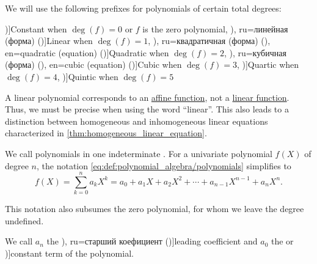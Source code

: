 \begin{definition}\label{def:polynomial_degree_terminology}
  We will use the following prefixes for polynomials of certain total degrees:
  \begin{thmenum}
     \term[ru=константа (\cite[118]{Тыртышников2007ЛинейнаяАлгебра})]{Constant} when \( \deg(f) = 0 \) or \( f \) is the zero polynomial,
     \term[bg=линейна (функция) (\cite[1]{Обрешков1962ВисшаАлгебра}), ru=линейная (форма) (\cite[315]{Курош1968КурсВысшейАлгебры})]{Linear} when \( \deg(f) = 1 \),
     \term[bg=квадратна (функция) (\cite[1]{Обрешков1962ВисшаАлгебра}), ru=квадратичная (форма) (\cite[315]{Курош1968КурсВысшейАлгебры}), en=quadratic (equation) (\cite[30]{GowersEtAl2008PrincetonCompanion})]{Quadratic} when \( \deg(f) = 2 \),
     \term[bg=кубична (форма) (\cite[1]{Обрешков1962ВисшаАлгебра}), ru=кубичная (форма) (\cite[315]{Курош1968КурсВысшейАлгебры}), en=cubic (equation) (\cite[30]{GowersEtAl2008PrincetonCompanion})]{Cubic} when \( \deg(f) = 3 \),
     \term[en=quartic (equation) (\cite[30]{GowersEtAl2008PrincetonCompanion})]{Quartic} when \( \deg(f) = 4 \),
     \term[en=quintic (equation) (\cite[30]{GowersEtAl2008PrincetonCompanion})]{Quintic} when \( \deg(f) = 5 \)
  \end{thmenum}
\end{definition}
\begin{comments}
  \item A linear polynomial corresponds to an \hyperref[def:affine_operator]{affine function}, not a \hyperref[def:linear_function]{linear function}. Thus, we must be precise when using the word \enquote{linear}. This also leads to a distinction between homogeneous and inhomogeneous linear equations characterized in \cref{thm:homogeneous_linear_equation}.
\end{comments}

\begin{definition}\label{def:univariate_polynomial}\mimprovised
  We call polynomials in one indeterminate . For a univariate polynomial \( f(X) \) of degree \( n \), the notation \eqref{eq:def:polynomial_algebra/polynomials} simplifies to
  \begin{equation}\label{eq:def:univariate_polynomial}
    f(X) = \sum_{k=0}^n a_k X^k = a_0 + a_1 X + a_2 X^2 + \cdots + a_{n-1} X^{n-1} + a_n X^n.
  \end{equation}

  This notation also subsumes the zero polynomial, for whom we leave the degree undefined.

  We call \( a_n \) the \term[bg=старши коефициент (\cite[23]{ГеновМиховскиМоллов1991Алгебра}), ru=старший коефициент (\cite[118]{Тыртышников2007ЛинейнаяАлгебра})]{leading coefficient} and \( a_0 \) the  or \term[ru=свободный член (\cite[118]{Тыртышников2007ЛинейнаяАлгебра})]{constant term} of the polynomial.
\end{definition}

